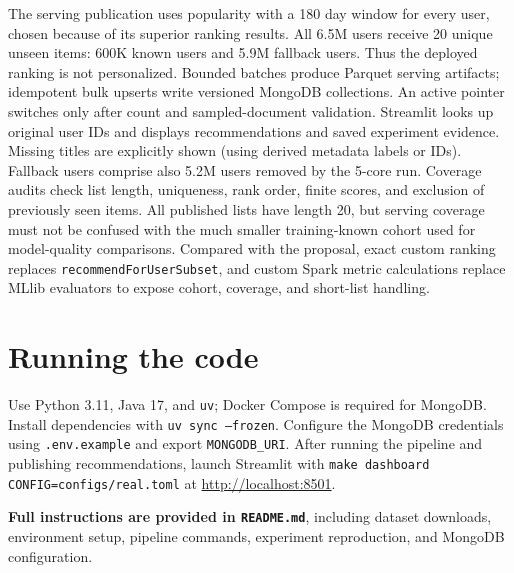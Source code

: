 \documentclass[10pt,a4paper]{article}
\begin{document}
The serving publication uses popularity with a 180 day window for every user,
chosen because of its superior ranking results. All 6.5M users receive 20
unique unseen items: 600K known users and 5.9M fallback users. Thus the
deployed ranking is not personalized. Bounded batches produce Parquet serving
artifacts; idempotent bulk upserts write versioned MongoDB collections. An active
pointer switches only after count and sampled-document validation. Streamlit
looks up original user IDs and displays recommendations and saved experiment
evidence. Missing titles are explicitly shown (using derived metadata labels or IDs).
Fallback users comprise also 5.2M users removed by the 5-core run. Coverage audits check list length, uniqueness,
rank order, finite scores, and exclusion of previously seen items. All published
lists have length 20, but serving coverage must not be confused with the much
smaller training-known cohort used for model-quality comparisons.
Compared with the proposal, exact custom ranking replaces
\texttt{recommendForUserSubset}, and custom Spark metric calculations replace
MLlib evaluators to expose cohort, coverage, and short-list handling.

\section*{Running the code}
Use Python 3.11, Java 17, and \texttt{uv}; Docker Compose is required for MongoDB.
Install dependencies with \texttt{uv sync --frozen}. Configure the MongoDB
credentials using \texttt{.env.example} and export \texttt{MONGODB\_URI}.
After running the pipeline and publishing recommendations, launch Streamlit with
\texttt{make dashboard CONFIG=configs/real.toml} at \url{http://localhost:8501}.

\textbf{Full instructions are provided in \texttt{README.md}}, including dataset
downloads, environment setup, pipeline commands, experiment reproduction, and
MongoDB configuration.
\end{document}
